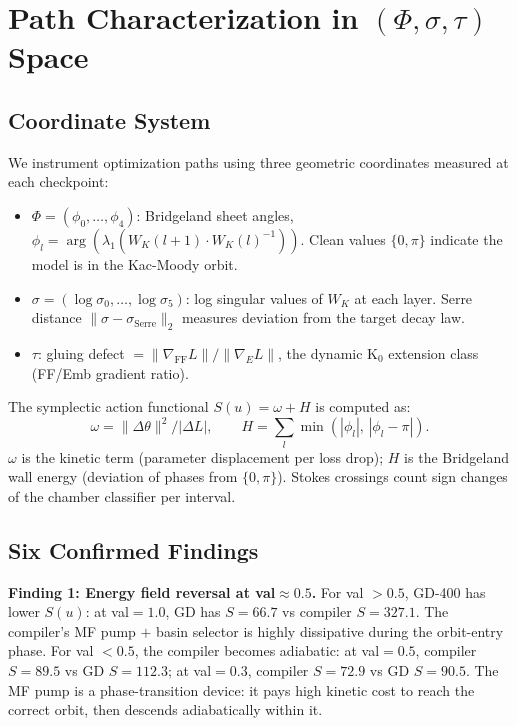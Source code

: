 \documentclass[11pt]{amsart}
\begin{document}
\section{Path Characterization in $(\Phi, \sigma, \tau)$ Space}
\label{sec:paths}

\subsection{Coordinate System}

We instrument optimization paths using three geometric coordinates
measured at each checkpoint:
\begin{itemize}
\item $\Phi = (\phi_0,\ldots,\phi_4)$: Bridgeland sheet angles,
  $\phi_l = \arg(\lambda_1(W_K(l{+}1)\cdot W_K(l)^{-1}))$.
  Clean values $\{0,\pi\}$ indicate the model is in the Kac-Moody orbit.
\item $\sigma = (\log\sigma_0,\ldots,\log\sigma_5)$: log singular values
  of $W_K$ at each layer. Serre distance $\|{\sigma - \sigma_\mathrm{Serre}}\|_2$
  measures deviation from the target decay law.
\item $\tau$: gluing defect $= \|\nabla_\mathrm{FF} L\|/\|\nabla_E L\|$,
  the dynamic K$_0$ extension class (FF/Emb gradient ratio).
\end{itemize}

The symplectic action functional $S(u) = \omega + H$ is computed as:
\[
  \omega = \|\Delta\theta\|^2 / |\Delta L|, \qquad
  H = \sum_l \min(|\phi_l|,\, |\phi_l - \pi|).
\]
$\omega$ is the kinetic term (parameter displacement per loss drop);
$H$ is the Bridgeland wall energy (deviation of phases from $\{0,\pi\}$).
Stokes crossings count sign changes of the chamber classifier per interval.

\subsection{Six Confirmed Findings}

\textbf{Finding 1: Energy field reversal at val$\approx 0.5$.}
For val $> 0.5$, GD-400 has lower $S(u)$:
at val$=1.0$, GD has $S=66.7$ vs compiler $S=327.1$.
The compiler's MF pump $+$ basin selector is highly dissipative
during the orbit-entry phase.
For val $< 0.5$, the compiler becomes adiabatic:
at val$=0.5$, compiler $S=89.5$ vs GD $S=112.3$;
at val$=0.3$, compiler $S=72.9$ vs GD $S=90.5$.
The MF pump is a phase-transition device:
it pays high kinetic cost to reach the correct orbit,
then descends adiabatically within it.
\end{document}
